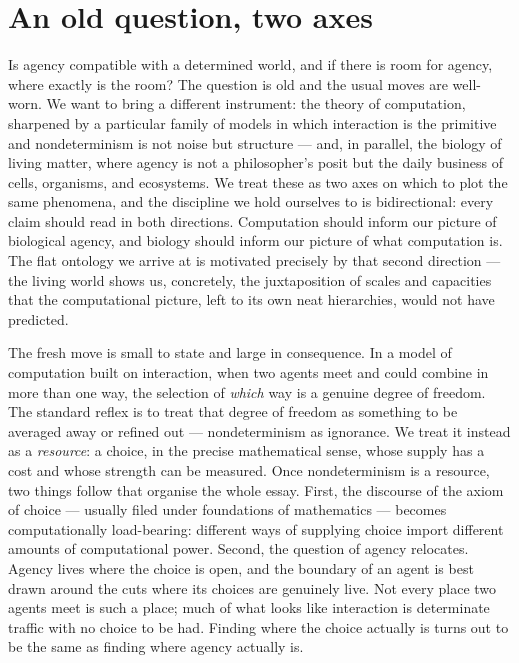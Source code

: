 \documentclass[11pt]{article}
\theoremstyle{definition}
\theoremstyle{plain}
\theoremstyle{remark}
\begin{document}
\section{An old question, two axes}

Is agency compatible with a determined world, and if there is room for agency,
where exactly is the room? The question is old and the usual moves are
well-worn. We want to bring a different instrument: the theory of computation,
sharpened by a particular family of models in which interaction is the primitive
and nondeterminism is not noise but structure --- and, in parallel, the biology
of living matter, where agency is not a philosopher's posit but the daily
business of cells, organisms, and ecosystems. We treat these as two axes on which
to plot the same phenomena, and the discipline we hold ourselves to is
bidirectional: every claim should read in both directions. Computation should
inform our picture of biological agency, and biology should inform our picture of
what computation is. The flat ontology we arrive at is motivated precisely by
that second direction --- the living world shows us, concretely, the
juxtaposition of scales and capacities that the computational picture, left to
its own neat hierarchies, would not have predicted.

The fresh move is small to state and large in consequence. In a model of
computation built on interaction, when two agents meet and could combine in more
than one way, the selection of \emph{which} way is a genuine degree of freedom.
The standard reflex is to treat that degree of freedom as something to be averaged
away or refined out --- nondeterminism as ignorance. We treat it instead as a
\emph{resource}: a choice, in the precise mathematical sense, whose supply has a
cost and whose strength can be measured. Once nondeterminism is a resource, two
things follow that organise the whole essay. First, the discourse of the axiom of
choice --- usually filed under foundations of mathematics --- becomes
computationally load-bearing: different ways of supplying choice import different
amounts of computational power. Second, the question of agency relocates. Agency
lives where the choice is open, and the boundary of an agent is best drawn around
the cuts where its choices are genuinely live. Not every place two agents meet is
such a place; much of what looks like interaction is determinate traffic with no
choice to be had. Finding where the choice actually is turns out to be the same
as finding where agency actually is.
\end{document}
